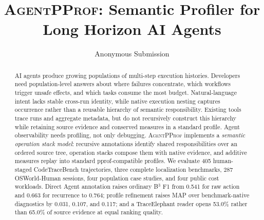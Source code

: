 \documentclass[letterpaper]{article}
\newcommand{\sys}{\textsc{AgentPProf}\xspace}
\begin{document}
\title{\sys: Semantic Profiler for Long Horizon AI Agents}
\author{Anonymous Submission}
\affiliations{}

\maketitle

\begin{abstract}
AI agents produce growing populations of multi-step execution histories.
Developers need population-level answers about where failures concentrate,
which workflows trigger unsafe effects, and which tasks consume the most
budget.
Natural-language intent lacks stable cross-run identity, while native execution
nesting captures occurrence rather than a reusable hierarchy of semantic
responsibility.
Existing tools trace runs and aggregate metadata, but do not recursively
construct this hierarchy while retaining source evidence and conserved
measures in a standard profile.
Agent observability needs profiling, not only debugging.
\sys implements a \emph{semantic operation stack model}: recursive annotations
identify shared responsibilities over an ordered source tree, operation stacks
compose them with native evidence, and additive measures replay into standard
pprof-compatible profiles.
We evaluate 405 human-staged CodeTraceBench trajectories, three complete
localization benchmarks, 287 OSWorld-Human sessions, four population case
studies, and four public cost workloads.
Direct Agent annotation raises ordinary B$^3$ F1 from 0.541 for raw action and
0.663 for recurrence to 0.764; profile refinement raises MAP over
benchmark-native diagnostics by 0.031, 0.107, and 0.117; and a TraceElephant
reader opens 53.0\% rather than 65.0\% of source evidence at equal ranking
quality.

\end{abstract}
\end{document}
